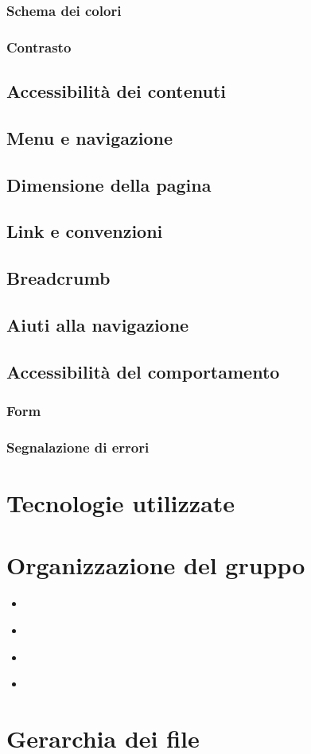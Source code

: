 \documentclass[12pt,a4paper]{article}
\begin{document}
\subsubsection{Schema dei colori}
\subsubsection{Contrasto}
\subsection{Accessibilità dei contenuti}
\subsection{Menu e navigazione}
\subsection{Dimensione della pagina}
\subsection{Link e convenzioni}
\subsection{Breadcrumb}
\subsection{Aiuti alla navigazione}
\subsection{Accessibilità del comportamento}
\subsubsection{Form}
\subsubsection{Segnalazione di errori}



\section{Tecnologie utilizzate}
\appendix
\section{Organizzazione del gruppo}
\textit{\textbf{\TF{}}}
\begin{itemize}
	\item 
\end{itemize}
\textit{\textbf{\LB{}}}
\begin{itemize}
	\item 
\end{itemize}
\textit{\textbf{\AB{}}}
\begin{itemize}
	\item 
\end{itemize}
\textit{\textbf{\EC{}}}
\begin{itemize}
	\item 
\end{itemize}

\section{Gerarchia dei file}
\end{document}
